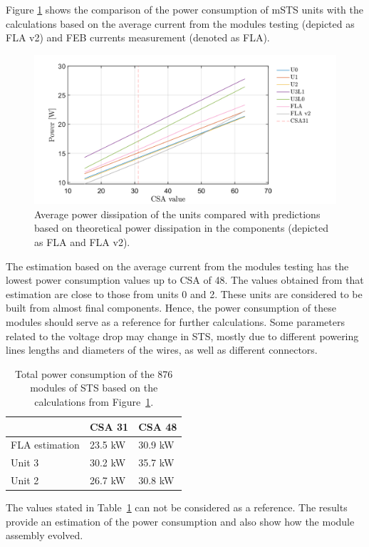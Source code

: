 Figure \ref{fig_theor} shows the comparison of the power consumption of \gls{mSTS} units with the calculations based on the average current from the modules testing (depicted as FLA v2) and FEB currents measurement (denoted as FLA). 

\begin{figure}[h!]
\centering
\includegraphics[width=0.95\columnwidth]{Chapter6/DCS/images/theor.png}
\caption{Average power dissipation of the units compared with predictions based on theoretical power dissipation in the components (depicted as FLA and FLA v2).} 
\label{fig_theor}
\end{figure}
The estimation based on the average current from the modules testing has the lowest power consumption values up to CSA of 48. The values obtained from that estimation are close to those from units 0 and 2. These units are considered to be built from almost final components. Hence, the power consumption of these modules should serve as a reference for further calculations. Some parameters related to the voltage drop may change in \gls{STS}, mostly due to different powering lines lengths and diameters of the wires, as well as different connectors. 
\begin{table}[h!]
\caption{Total power consumption of the 876 modules of \gls{STS} based on the calculations from Figure~\ref{fig_theor}.}
\centering
\begin{tabular}{lll}
\hline
               & \gls{CSA} 31  & \gls{CSA} 48  \\ \hline
FLA estimation & 23.5 kW & 30.9 kW \\
Unit 3         & 30.2 kW & 35.7 kW \\
Unit 2         & 26.7 kW & 30.8 kW \\ \hline
\end{tabular}

\label{tab:power_cons}
\end{table}
The values stated in Table~\ref{tab:power_cons} can not be considered as a reference. The results provide an estimation of the power consumption and also show how the module assembly evolved. 
